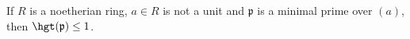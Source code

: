 If $R$ is a noetherian ring, $a \in R$ is not a unit and $\mathfrak{p}$ is a minimal
prime over $(a)$, then $\hgt(\mathfrak{p})\leq 1$.
